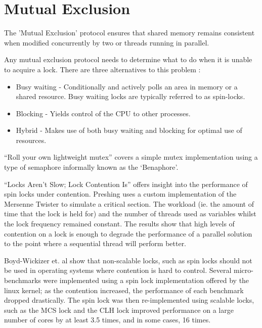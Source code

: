 \section{Mutual Exclusion}
The 'Mutual Exclusion' protocol ensures that shared memory remains consistent when modified concurrently by two or threads running in parallel.


Any mutual exclusion protocol needs to determine what to do when it is unable to acquire a lock. There are three alternatives to this problem \cite[Chapter~7]{herlihy2020art}:
\begin{itemize}
  \item Busy waiting - Conditionally and actively polls an area in memory or a shared resource. Busy waiting locks are typically referred to as spin-locks.
  \item Blocking - Yields control of the CPU to other processes.
  \item Hybrid - Makes use of both busy waiting and blocking for optimal use of resources.
\end{itemize}

``Roll your own lightweight mutex''\cite{preshingmutex} covers a simple mutex implementation using a type of semaphore informally known as the `Benaphore'\cite{haikubenaphore}.

``Locks Aren't Slow; Lock Contention Is''\cite{preshinglockcontentionslow} offers insight into the performance of spin locks under contention. Preshing uses a custom implementation of the Mersenne Twister \cite{matsumoto1998mersenne} to simulate a critical section. The workload (ie. the amount of time that the lock is held for) and the number of threads used as variables whilst the lock frequency remained constant. The results show that high levels of contention on a lock is enough to degrade the performance of a parallel solution to the point where a sequential thread will perform better.

Boyd-Wickizer et. al show that non-scalable locks, such as spin locks should not be used in operating systems where contention is hard to control. Several micro-benchmarks were implemented using a spin lock implementation offered by the linux kernel; as the contention increased, the performance of each benchmark dropped drastically. The spin lock was then re-implemented using scalable locks, such as the MCS lock \cite{mellor1991algorithms} and the CLH lock \cite{craig1993building,magnusson1994queue} improved performance on a large number of cores by at least 3.5 times, and in some cases, 16 times.


